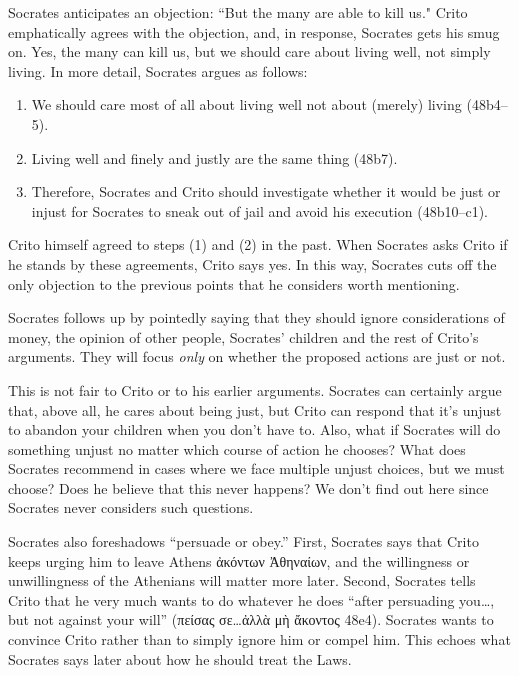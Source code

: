 \documentclass[12pt,letterpaper]{article}
\begin{document}
Socrates anticipates an objection: ``But the many are able to kill us." Crito emphatically agrees with the objection, and, in response, Socrates gets his smug on. Yes, the many can kill us, but we should care about living well, not simply living. In more detail, Socrates argues as follows:

\begin{enumerate}
    \item We should care most of all about living well not about (merely) living (48b4--5).
    \item Living well and finely and justly are the same thing (48b7).
    \item Therefore, Socrates and Crito should investigate whether it would be just or injust for Socrates to sneak out of jail and avoid his execution (48b10--c1).
\end{enumerate}

Crito himself agreed to steps (1) and (2) in the past. When Socrates asks Crito if he stands by these agreements, Crito says yes. In this way, Socrates cuts off the only objection to the previous points that he considers worth mentioning.

Socrates follows up by pointedly saying that they should ignore considerations of money, the opinion of other people, Socrates' children and the rest of Crito's arguments. They will focus \emph{only} on whether the proposed actions are just or not.

This is not fair to Crito or to his earlier arguments. Socrates can certainly argue that, above all, he cares about being just, but Crito can respond that it's unjust to abandon your children when you don't have to. Also, what if Socrates will do something unjust no matter which course of action he chooses? What does Socrates recommend in cases where we face multiple unjust choices, but we must choose? Does he believe that this never happens? We don't find out here since Socrates never considers such questions.

Socrates also foreshadows ``persuade or obey.'' First, Socrates says that Crito keeps urging him to leave Athens \textgreek{ἀκόντων Ἀθηναίων}, and the willingness or unwillingness of the Athenians will matter more later. Second, Socrates tells Crito that he very much wants to do whatever he does ``after persuading you\dots, but not against your will'' (\textgreek{πείσας σε}\dots\textgreek{ἀλλὰ μὴ ἄκοντος} 48e4). Socrates wants to convince Crito rather than to simply ignore him or compel him. This echoes what Socrates says later about how he should treat the Laws.
\end{document}
